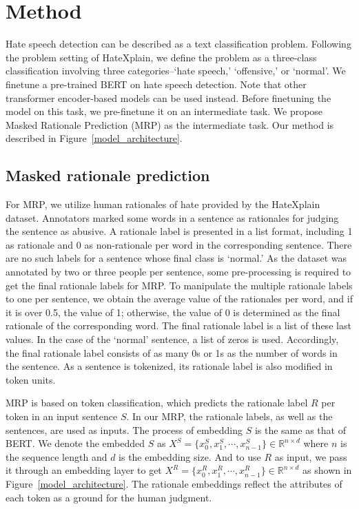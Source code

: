 \documentclass[11pt]{article}
\begin{document}
\section{Method}
Hate speech detection can be described as a text classification problem. Following the problem setting of HateXplain, we define the problem as a three-class classification involving three categories--`hate speech,' `offensive,' or `normal'. We finetune a pre-trained BERT on hate speech detection. Note that other transformer encoder-based models can be used instead. Before finetuning the model on this task, we pre-finetune it on an intermediate task. We propose Masked Rationale Prediction (MRP) as the intermediate task. Our method is described in Figure~\ref{model_architecture}.

\subsection{Masked rationale prediction}
For MRP, we utilize human rationales of hate provided by the HateXplain dataset. Annotators marked some words in a sentence as rationales for judging the sentence as abusive. A rationale label is presented in a list format, including 1 as rationale and 0 as non-rationale per word in the corresponding sentence. There are no such labels for a sentence whose final class is `normal.' As the dataset was annotated by two or three people per sentence, some pre-processing is required to get the final rationale labels for MRP. To manipulate the multiple rationale labels to one per sentence, we obtain the average value of the rationales per word, and if it is over 0.5, the value of 1; otherwise, the value of 0 is determined as the final rationale of the corresponding word. The final rationale label is a list of these last values.
In the case of the `normal' sentence, a list of zeros is used. Accordingly, the final rationale label consists of as many 0s or 1s as the number of words in the sentence. As a sentence is tokenized, its rationale label is also modified in token units.

MRP is based on token classification, which predicts the rationale label $R$ per token in an input sentence $S$. In our MRP, the rationale labels, as well as the sentences, are used as inputs. The process of embedding  $S$ is the same as that of BERT. We denote the embedded $S$ as $X^S=\{x_0^S, x_1^S, \cdots, x_{n-1}^S\} \in \mathbb{R}^{n\times d}$ where $n$ is the sequence length and $d$ is the embedding size. And to use $R$ as input, we pass it through an embedding layer to get $X^R=\{x_0^R, x_1^R, \cdots, x_{n-1}^R\} \in \mathbb{R}^{n\times d}$ as shown in Figure~\ref{model_architecture}.
The rationale embeddings reflect the attributes of each token as a ground for the human judgment.
\end{document}
